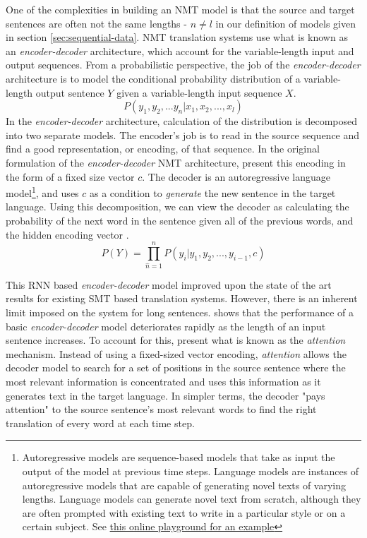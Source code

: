 \newcommand{\ed}{\emph{encoder-decoder}}
One of the complexities in building an NMT model is that the source and target sentences are often not the same lengths - $n \neq l$ in our definition of \seq{} models given in section \ref{sec:sequential-data}. NMT translation systems use what is known as an \ed{} architecture, which account for the variable-length input and output sequences. From a probabilistic perspective, the job of the \ed{} architecture is to model the conditional probability distribution of a variable-length output sentence $Y$ given a variable-length input sequence $X$. $$ P(y_1, y_2, ... y_n | x_1, x_2, ..., x_l)$$ In the \ed{} architecture, calculation of the distribution is decomposed into two separate models. The encoder's job is to read in the source sequence and find a good representation, or encoding, of that sequence. In the original formulation of the \ed{} NMT architecture, \citet{cho2014learning} present this encoding in the form of a fixed size vector $c$. The decoder is an autoregressive language model\footnote{Autoregressive models are sequence-based models that take as input the output of the model at previous time steps. Language models are instances of autoregressive models that are capable of generating novel texts of varying lengths. Language models can generate novel text from scratch, although they are often prompted with existing text to write in a particular style or on a certain subject. See \href{https://transformer.huggingface.co/doc/distil-gpt2}{this online playground for an example}}, and uses $c$ as a condition to \emph{generate} the new sentence in the target language. Using this decomposition, we can view the decoder as calculating the probability of the next word in the sentence given all of the previous words, and the hidden encoding vector \cite{bahdanau2014neural}. $$P(Y) = \prod_{\hat{n}=1}^{n}P(y_i \vert y_1, y_2, ..., y_{i-1}, c)$$

\newcommand{\at}[1]{\emph{#1}}

This RNN based \ed{} model improved upon the state of the art results for existing SMT based translation systems. However, there is an inherent limit imposed on the system for long sentences. \citet{cho2014learning} shows that the performance of a basic \ed{} model deteriorates rapidly as the length of an input sentence increases. To account for this, 
\citet{bahdanau2014neural} present what is known as the \at{attention} mechanism. Instead of using a fixed-sized vector encoding, \at{attention} allows the decoder model to search for a set of positions in the source sentence where the most relevant information is concentrated and uses this information as it generates text in the target language. In simpler terms, the decoder "pays attention" to the source sentence's most relevant words to find the right translation of every word at each time step. 

